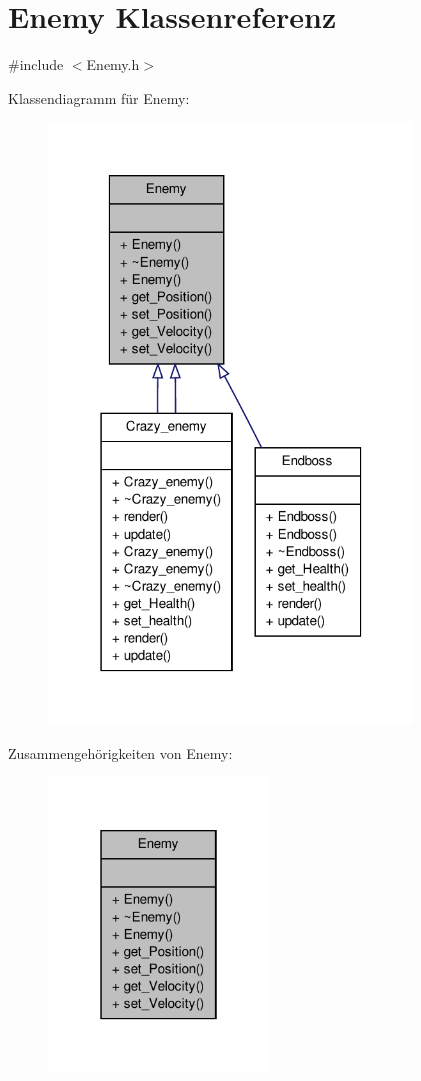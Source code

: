 \hypertarget{class_enemy}{\section{Enemy Klassenreferenz}
\label{class_enemy}
}


{\ttfamily \#include $<$Enemy.\-h$>$}



Klassendiagramm für Enemy\-:
\nopagebreak
\begin{figure}[H]
\begin{center}
\leavevmode
\includegraphics[width=274pt]{class_enemy__inherit__graph}
\end{center}
\end{figure}


Zusammengehörigkeiten von Enemy\-:
\nopagebreak
\begin{figure}[H]
\begin{center}
\leavevmode
\includegraphics[width=166pt]{class_enemy__coll__graph}
\end{center}
\end{figure}
